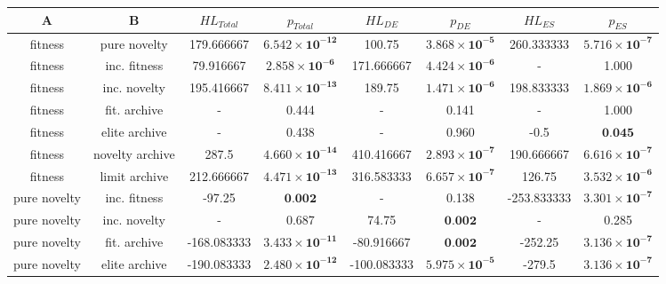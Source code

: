 \begin{tabular}{cccccccc}
\toprule
              A &               B & ${HL}_{Total}$ &                      $p_{Total}$ & ${HL}_{DE}$ &                        $p_{DE}$ & ${HL}_{ES}$ &                        $p_{ES}$ \\
\midrule
        fitness &    pure novelty &     179.666667 & $\mathbf{6.542 \times 10^{-12}}$ &      100.75 & $\mathbf{3.868 \times 10^{-5}}$ &  260.333333 & $\mathbf{5.716 \times 10^{-7}}$ \\
        fitness &    inc. fitness &      79.916667 &  $\mathbf{2.858 \times 10^{-6}}$ &  171.666667 & $\mathbf{4.424 \times 10^{-6}}$ &           - &                           1.000 \\
        fitness &    inc. novelty &     195.416667 & $\mathbf{8.411 \times 10^{-13}}$ &      189.75 & $\mathbf{1.471 \times 10^{-6}}$ &  198.833333 & $\mathbf{1.869 \times 10^{-6}}$ \\
        fitness &    fit. archive &              - &                            0.444 &           - &                           0.141 &           - &                           1.000 \\
        fitness &   elite archive &              - &                            0.438 &           - &                           0.960 &        -0.5 &                $\textbf{0.045}$ \\
        fitness & novelty archive &          287.5 & $\mathbf{4.660 \times 10^{-14}}$ &  410.416667 & $\mathbf{2.893 \times 10^{-7}}$ &  190.666667 & $\mathbf{6.616 \times 10^{-7}}$ \\
        fitness &   limit archive &     212.666667 & $\mathbf{4.471 \times 10^{-13}}$ &  316.583333 & $\mathbf{6.657 \times 10^{-7}}$ &      126.75 & $\mathbf{3.532 \times 10^{-6}}$ \\
   pure novelty &    inc. fitness &         -97.25 &                 $\textbf{0.002}$ &           - &                           0.138 & -253.833333 & $\mathbf{3.301 \times 10^{-7}}$ \\
   pure novelty &    inc. novelty &              - &                            0.687 &       74.75 &                $\textbf{0.002}$ &           - &                           0.285 \\
   pure novelty &    fit. archive &    -168.083333 & $\mathbf{3.433 \times 10^{-11}}$ &  -80.916667 &                $\textbf{0.002}$ &     -252.25 & $\mathbf{3.136 \times 10^{-7}}$ \\
   pure novelty &   elite archive &    -190.083333 & $\mathbf{2.480 \times 10^{-12}}$ & -100.083333 & $\mathbf{5.975 \times 10^{-5}}$ &      -279.5 & $\mathbf{3.136 \times 10^{-7}}$ \\

\end{tabular}
